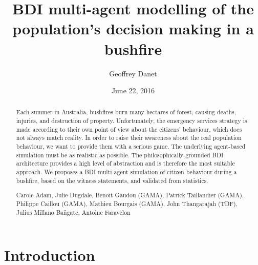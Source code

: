 \documentclass[12pt, a4paper]{memoir} %
\title{BDI multi-agent modelling of the population's decision making in a bushfire}%
\author{Geoffrey Danet}
\date{June 22, 2016} %
\begin{document}
\frontmatter
\begin{titlingpage}
\maketitle
\end{titlingpage}

\setlength{\parskip}{-1pt plus 1pt}

\renewcommand{\abstracttextfont}{\normalfont}
\abstractintoc
\begin{abstract}
	Each summer in Australia, bushfires burn many hectares of forest, causing deaths, injuries, and destruction of property.
	Unfortunately, the emergency services strategy is made according to their own point of view about the citizens' behaviour,
	which does not always match reality. In order to raise their awareness about the real population behaviour, we want to
	provide them with a serious game. The underlying agent-based simulation must be as realistic as possible.
	The philosophically-grounded BDI architecture provides a high level of abstraction and is therefore the most suitable
	approach. We proposes a BDI multi-agent simulation of citizen behaviour during a bushfire, based on the witness statements,
	and validated from statistics.
\end{abstract}

\newpage

\abstractintoc
\renewcommand\abstractname{Acknowledgement}
\begin{abstract}
	Carole Adam,
	Julie Dugdale,
	Benoit Gaudou (GAMA),
	Patrick Taillandier (GAMA),
	Philippe Caillou (GAMA),
	Mathieu Bourgais (GAMA),
	John Thangarajah (TDF),
	Julius Millano Ba\~ngate,
	Antoine Faravelon
\end{abstract}

\cleardoublepage

\tableofcontents* %
\normalsize

\mainmatter
\SingleSpace

\chapter{Introduction}
\end{document}
